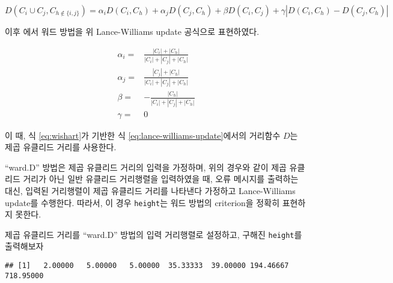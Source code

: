 \documentclass[
]{book}
\newenvironment{Shaded}{\begin{snugshade}}{\end{snugshade}}
\newcommand{\AttributeTok}[1]{\textcolor[rgb]{0.77,0.63,0.00}{#1}}
\newcommand{\DecValTok}[1]{\textcolor[rgb]{0.00,0.00,0.81}{#1}}
\newcommand{\FunctionTok}[1]{\textcolor[rgb]{0.00,0.00,0.00}{#1}}
\newcommand{\NormalTok}[1]{#1}
\newcommand{\OtherTok}[1]{\textcolor[rgb]{0.56,0.35,0.01}{#1}}
\newcommand{\SpecialCharTok}[1]{\textcolor[rgb]{0.00,0.00,0.00}{#1}}
\newcommand{\StringTok}[1]{\textcolor[rgb]{0.31,0.60,0.02}{#1}}
\begin{document}
\begin{equation}
D(C_i \cup C_j, C_{h \notin \{i, j\}}) = \alpha_i D(C_i, C_h) + \alpha_j D(C_j, C_h) + \beta D(C_i, C_j) + \gamma |D(C_i, C_h) - D(C_j, C_h)|
\label{eq:lance-williams-update}
\end{equation}

이후 \citet{wishart1969256} 에서 워드 방법을 위 Lance-Williams update 공식으로 표현하였다.

\begin{equation}
\begin{split}
\alpha_i =& \frac{|C_i| + |C_h|}{|C_i| + |C_j| + |C_h|}\\
\alpha_j =& \frac{|C_j| + |C_h|}{|C_i| + |C_j| + |C_h|}\\
\beta =& - \frac{|C_h|}{|C_i| + |C_j| + |C_h|}\\
\gamma =& 0
\end{split}
\label{eq:wishart}
\end{equation}

이 때, 식 \eqref{eq:wishart}가 기반한 식 \eqref{eq:lance-williams-update}에서의 거리함수 \(D\)는 제곱 유클리드 거리를 사용한다.

``ward.D'' 방법은 제곱 유클리드 거리의 입력을 가정하며, 위의 경우와 같이 제곱 유클리드 거리가 아닌 일반 유클리드 거리행렬을 입력하였을 때, 오류 메시지를 출력하는 대신, 입력된 거리행렬이 제곱 유클리드 거리를 나타낸다 가정하고 Lance-Williams update를 수행한다. 따라서, 이 경우 \texttt{height}는 워드 방법의 criterion을 정확히 표현하지 못한다.

제곱 유클리드 거리를 ``ward.D'' 방법의 입력 거리행렬로 설정하고, 구해진 \texttt{height}를 출력해보자

\begin{Shaded}
\end{Shaded}

\begin{verbatim}
## [1]   2.00000   5.00000   5.00000  35.33333  39.00000 194.46667 718.95000
\end{verbatim}
\end{document}
